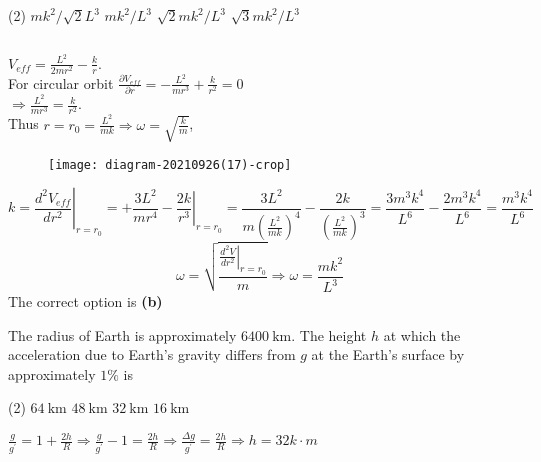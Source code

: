 \begin{enumerate}
\begin{minipage}{\textwidth}
\end{minipage}
\begin{tasks}(2)
	\task[\textbf{A.}] $m k^{2} / \sqrt{2} L^{3}$
	\task[\textbf{B.}]$m k^{2} / L^{3}$
	\task[\textbf{C.}]$\sqrt{2} m k^{2} / L^{3}$
	\task[\textbf{D.}]$\sqrt{3} m k^{2} / L^{3}$
\end{tasks}
\begin{answer}$\left. \right. $\\
	\begin{minipage}{0.5\textwidth}
	$V_{e f f}=\frac{L^{2}}{2 m r^{2}}-\frac{k}{r} .$\\
	For circular orbit $\frac{\partial V_{e f f}}{\partial r}=-\frac{L^{2}}{m r^{3}}+\frac{k}{r^{2}}=0$ \\
	$\Rightarrow \frac{L^{2}}{m r^{3}}=\frac{k}{r^{2}} .$ \\
	Thus $r=r_{0}=\frac{L^{2}}{m k} \Rightarrow \omega=\sqrt{\frac{k}{m}}$,
	\end{minipage}
\begin{minipage}{0.5\textwidth}
\begin{figure}[H]
	\centering
	\texttt{[image: diagram-20210926(17)-crop]}
\end{figure}
\end{minipage}
 $$k=\left.\frac{d^{2} V_{e f f}}{d r^{2}}\right|_{r=r_{0}}=+\frac{3 L^{2}}{m r^{4}}-\left.\frac{2 k}{r^{3}}\right|_{r=r_{0}}=\frac{3 L^{2}}{m\left(\frac{L^{2}}{m k}\right)^{4}}-\frac{2 k}{\left(\frac{L^{2}}{m k}\right)^{3}}=\frac{3 m^{3} k^{4}}{L^{6}}-\frac{2 m^{3} k^{4}}{L^{6}}=\frac{m^{3} k^{4}}{L^{6}}$$
 $$\omega=\sqrt{\frac{\left.\frac{d^{2} V}{d r^{2}}\right|_{r=r_{0}}}{m}} \Rightarrow \omega=\frac{m k^{2}}{L^{3}}$$
 The correct option is \textbf{(b)}	
\end{answer}
\begin{minipage}{\textwidth}
\item The radius of Earth is approximately $6400 \mathrm{~km}$. The height $h$ at which the acceleration due to Earth's gravity differs from $g$ at the Earth's surface by approximately $1 \%$ is
\end{minipage}
\begin{tasks}(2)
	\task[\textbf{A.}] $64 \mathrm{~km}$
	\task[\textbf{B.}] $48 \mathrm{~km}$
	\task[\textbf{C.}]$32 \mathrm{~km}$
	\task[\textbf{D.}]$16 \mathrm{~km}$
\end{tasks}
\begin{answer}
$\frac{g}{g^{\prime}}=1+\frac{2 h}{R} \Rightarrow \frac{g}{g^{\prime}}-1=\frac{2 h}{R} \Rightarrow \frac{\Delta g}{g^{\prime}}=\frac{2 h}{R} \Rightarrow h=32 k \cdot m$	

\end{answer}
\end{enumerate}
